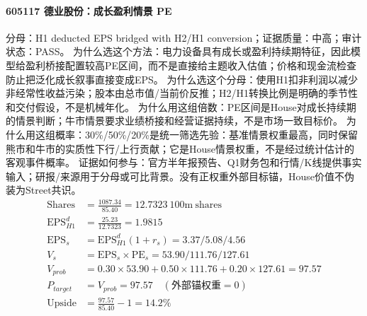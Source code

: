 \paragraph{605117 德业股份：成长盈利情景 PE}
分母：H1 deducted EPS bridged with H2/H1 conversion；证据质量：中高；审计状态：PASS。
为什么选这个方法：电力设备具有成长或盈利持续期特征，因此模型给盈利桥接配置较高PE区间，而不是直接给主题收入估值；价格和现金流检查防止把泛化成长叙事直接变成EPS。
为什么选这个分母：使用H1扣非利润以减少非经常性收益污染；股本由总市值/当前价反推；H2/H1转换比例是明确的季节性和交付假设，不是机械年化。
为什么用这组倍数：PE区间是House对成长持续期的情景判断；牛市情景要求业绩桥接和经营证据持续，不是市场一致目标价。
为什么用这组概率：30\%/50\%/20\%是统一筛选先验：基准情景权重最高，同时保留熊市和牛市的实质性下行/上行贡献；它是House情景权重，不是经过统计估计的客观事件概率。
证据如何参与：官方半年报预告、Q1财务包和行情/K线提供事实输入；研报/来源用于分母或可比背景。没有正权重外部目标锚，House价值不伪装为Street共识。
\begin{align*}
\mathrm{Shares} &= \frac{1087.34}{85.40}=12.7323\ \mathrm{100m\ shares}\\
\mathrm{EPS}_{H1}^d &= \frac{25.23}{12.7323}=1.9815\\
\mathrm{EPS}_s &= \mathrm{EPS}_{H1}^d(1+r_s)=3.37/5.08/4.56\\
V_s &= \mathrm{EPS}_s\times \mathrm{PE}_s=53.90/111.76/127.61\\
V_{prob} &= 0.30\times 53.90+0.50\times 111.76+0.20\times 127.61=97.57\\
P_{target} &= V_{prob}=97.57\quad(\text{外部锚权重}=0)\\
\mathrm{Upside} &= \frac{97.57}{85.40}-1=14.2\%\\
\end{align*}

